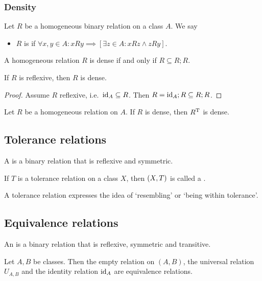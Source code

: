 \subsubsection{Density}
\begin{definition}
Let $R$ be a homogeneous binary relation on a class $A$. We say
\begin{itemize}
\item $R$ is  if $\forall x,y\in A: xRy \implies [\exists z\in A: xRz \land zRy]$.
\end{itemize}
\end{definition}

\begin{lemma}
A homogeneous relation $R$ is dense \textup{if and only if} $R \subseteq R;R$.
\end{lemma}
\begin{lemma}
If $R$ is reflexive, then $R$ is dense.
\end{lemma}
\begin{proof}
Assume $R$ reflexive, i.e.\ $\operatorname{id}_A\subseteq R$. Then $R = \operatorname{id}_A ;R \subseteq R;R$.
\end{proof}

\begin{lemma}
Let $R$ be a homogeneous relation on $A$. If $R$ is dense, then $R^{\mathrm{T}}$ is dense.
\end{lemma}

\subsection{Tolerance relations}
\begin{definition}
A  is a binary relation that is reflexive and symmetric.

If $T$ is a tolerance relation on a class $X$, then $\left( X,T \right)$ is called a .
\end{definition}
A tolerance relation expresses the idea of `resembling' or `being within tolerance'.


\subsection{Equivalence relations}
\begin{definition}
An  is a binary relation that is reflexive, symmetric and transitive.
\end{definition}

\begin{lemma}
Let $A,B$ be classes. Then the empty relation on $(A,B)$, the universal relation $U_{A,B}$ and the identity relation $\operatorname{id}_A$ are equivalence relations.
\end{lemma}

